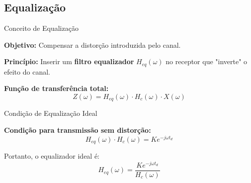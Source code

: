 \subsection{Equalização}

\begin{frame}{Conceito de Equalização}

\textbf{Objetivo:} Compensar a distorção introduzida pelo canal.

\textbf{Princípio:} Inserir um \textbf{filtro equalizador} $H_{eq}(\omega)$ no receptor que "inverte" o efeito do canal.

\begin{center}
\end{center}

\textbf{Função de transferência total:}
\[
Z(\omega) = H_{eq}(\omega) \cdot H_c(\omega) \cdot X(\omega)
\]

\end{frame}


\begin{frame}{Condição de Equalização Ideal}

\textbf{Condição para transmissão sem distorção:}
\[
H_{eq}(\omega) \cdot H_c(\omega) = K e^{-j\omega t_d}
\]

Portanto, o equalizador ideal é:
\[
H_{eq}(\omega) = \frac{K e^{-j\omega t_d}}{H_c(\omega)}
\]

\end{frame}


